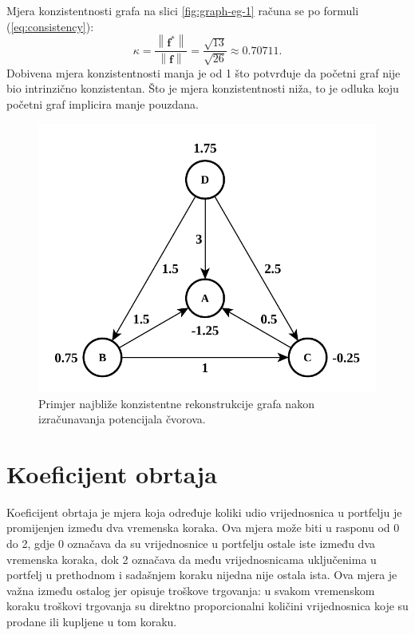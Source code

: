 \documentclass[lmodern, utf8, diplomski, numeric]{fer}
\newcommand{\matr}[1]{\mathbold{#1}}
\newcommand{\q}{\left}
\newcommand{\w}{\right}
\begin{document}
  Mjera konzistentnosti grafa na slici \ref{fig:graph-eg-1} računa se po formuli (\ref{eq:consistency}):
  \begin{equation*}
    \kappa = \frac{\q \lVert \matr{f^*} \w \rVert}{\q \lVert \matr{f} \w \rVert} = \frac{\sqrt{13}}{\sqrt{26}} \approx 0.70711.
  \end{equation*}
  Dobivena mjera konzistentnosti manja je od 1 što potvrđuje da početni graf nije bio intrinzično konzistentan.
  Što je mjera konzistentnosti niža, to je odluka koju početni graf implicira manje pouzdana.
  
  \begin{figure}[h]
    \centering
    \includegraphics[width=0.619\linewidth]{graphics/graph-eg-2.pdf}
    \caption{Primjer najbliže konzistentne rekonstrukcije grafa nakon izračunavanja potencijala čvorova.}
    \label{fig:graph-eg-2}
  \end{figure}
  
  \section{Koeficijent obrtaja}
  \label{sc:turnover}
  Koeficijent obrtaja  je mjera koja određuje koliki udio vrijednosnica u portfelju je promijenjen između dva vremenska koraka.
  Ova mjera može biti u rasponu od 0 do 2, gdje 0 označava da su vrijednosnice u portfelju ostale iste između dva vremenska koraka, dok 2 označava da među vrijednosnicama uključenima u portfelj u prethodnom i sadašnjem koraku nijedna nije ostala ista.
  Ova mjera je važna između ostalog jer opisuje troškove trgovanja: u svakom vremenskom koraku troškovi trgovanja su direktno proporcionalni količini vrijednosnica koje su prodane ili kupljene u tom koraku.
  
\end{document}

